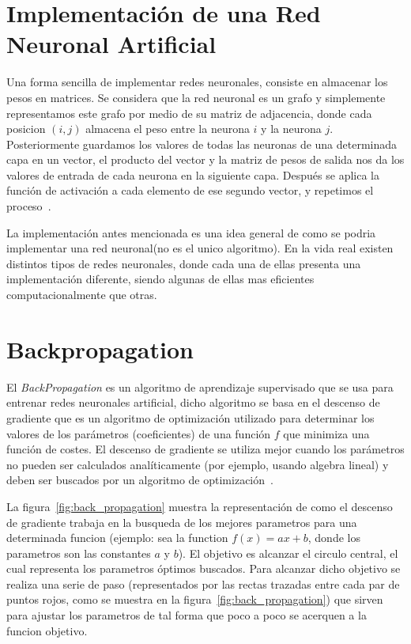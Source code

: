 \section{Implementación de una Red Neuronal Artificial}
Una forma sencilla de implementar redes neuronales, consiste en almacenar los pesos en matrices. Se considera que la red neuronal es un grafo y simplemente representamos este grafo por medio de su matriz de adjacencia, donde cada posicion $(i,j)$ almacena el peso entre la neurona $i$ y la neurona $j$. Posteriormente guardamos los valores de todas las neuronas de una determinada capa en un vector, el producto del vector y la matriz de pesos de salida nos da los valores de entrada de cada neurona en la siguiente capa. Después se aplica la función de activación a cada elemento de ese segundo vector, y repetimos el proceso~\cite{21RedesNeuronales}.

La implementación antes mencionada es una idea general de como se podria implementar una red neuronal(no es el unico algoritmo). En la vida real existen distintos tipos de redes neuronales, donde cada una de ellas presenta una implementación diferente, siendo algunas de ellas mas eficientes computacionalmente que otras.

\section{Backpropagation}
\label{sub:backpropagation}
El \textit{BackPropagation} es un algoritmo de aprendizaje supervisado que se usa para entrenar redes neuronales artificial, dicho algoritmo se basa en el descenso de gradiente que es un algoritmo de optimización utilizado para determinar los valores de los parámetros (coeficientes) de una función $f$ que minimiza una función de costes. El descenso de gradiente se utiliza mejor cuando los parámetros no pueden ser calculados analíticamente (por ejemplo, usando algebra lineal) y deben ser buscados por un algoritmo de optimización~\cite{27lehr1993backpropagation}.

La figura~\ref{fig:back_propagation} muestra la representación de como el descenso de gradiente trabaja en la busqueda de los mejores parametros para una determinada funcion (ejemplo: sea la function $f(x)=ax+b$, donde los parametros son las constantes $a$ y $b$). El objetivo es alcanzar el circulo central, el cual representa los parametros óptimos buscados. Para alcanzar dicho objetivo se realiza una serie de paso (representados por las rectas trazadas entre cada par de puntos rojos, como se muestra en la figura~\ref{fig:back_propagation}) que sirven para ajustar los parametros de tal forma que poco a poco se acerquen a la funcion objetivo.

